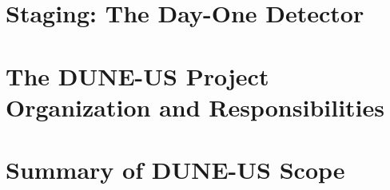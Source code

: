 \section{Staging: The Day-One Detector}
\label{intro:staging}



\section{The DUNE-US Project Organization and Responsibilities}
\label{intro:project}



\section{Summary of DUNE-US Scope}
\label{intro:us-scope}
